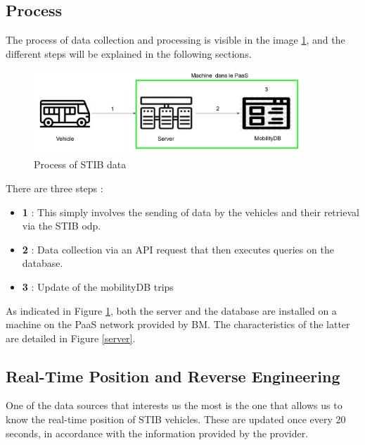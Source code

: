 \documentclass[12pt]{report}
\begin{document}
	
	\subsection{Process}
	
	The process of data collection and processing is visible in the image \ref{stib_data_process}, and the different steps will be explained in the following sections.
	
	
	\begin{center}
		\begin{figure}
			\centering
			\includegraphics[width=0.9\textwidth]{images/stib_data_process.png}
			\caption{Process of STIB data}
			\label{stib_data_process}
		\end{figure}
	\end{center}
	
	There are three steps :
	
	\begin{itemize}[noitemsep]
		\item \textbf{1} : This simply involves the sending of data by the vehicles and their retrieval via the STIB \acrshort{odp}.
		
		\item \textbf{2} : Data collection via an API request that then executes queries on the database.
		
		\item \textbf{3} : Update of the mobilityDB trips
	\end{itemize}
	
	
	As indicated in Figure \ref{stib_data_process}, both the server and the database are installed on a machine on the PaaS network provided by BM. The characteristics of the latter are detailed in Figure \ref{server}.
	
	
	\subsection{Real-Time Position and Reverse Engineering}
	\label{sec:RT&reverseEngineering}
	
	One of the data sources that interests us the most is the one that allows us to know the real-time position of STIB vehicles. These are updated once every 20 seconds, in accordance with the information provided by the provider.
	
\end{document}
